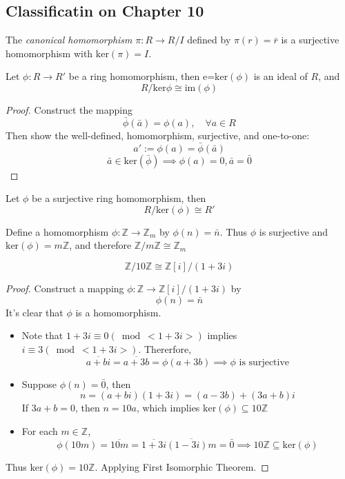 \subsection{Classificatin on Chapter 10}

\begin{proposition}
The \emph{canonical homomorphism} $\pi:R\to R/I$ defined by $\pi(r)=\bar{r}$ is a surjective homomorphism with $\mbox{ker}(\pi)=I$.
\end{proposition}
\begin{theorem}
Let $\phi:R\to R'$ be a ring homomorphism, then $\mbox{e=ker}(\phi)$ is an ideal of $R$, and
\[
R/\mbox{ker}\phi\cong\mbox{im}(\phi)
\]
\end{theorem}
\begin{proof}
Construct the mapping
\[
\bar{\phi}(\bar{a}) = \phi(a),\quad \forall a\in R
\]
Then show the well-defined, homomorphism, surjective, and one-to-one:
\[
a':=\phi(a)=\bar{\phi}(\bar a)
\]
\[
\bar{a}\in\mbox{ker}(\bar\phi)\implies\phi(a)=0,\bar a=\bar0
\]
\end{proof}
\begin{corollary}
Let $\phi$ be a surjective ring homomorphism, then 
\[
R/\mbox{ker}(\phi)\cong R'
\]
\end{corollary}
\begin{remark}
Define a homomorphism $\phi:\mathbb{Z}\to\mathbb{Z}_m$ by $\phi(n)=\bar n$. Thus $\phi$ is surjective and $\mbox{ker}(\phi)=m\mathbb{Z}$, and therefore $\mathbb{Z}/m\mathbb{Z}\cong\mathbb{Z}_m$
\end{remark}
\begin{proposition}
\[
\mathbb{Z}/10\mathbb{Z}\cong\mathbb{Z}[i]/(1+3i)
\]
\end{proposition}
\begin{proof}
Construct a mapping $\phi:\mathbb{Z}\to\mathbb{Z}[i]/(1+3i)$ by
\[
\phi(n)=\bar{n}
\]
It's clear that $\phi$ is a homomorphism.
\begin{itemize}
\item
Note that $1+3i\equiv0(\bmod <1+3i>)$ implies $i\equiv3(\bmod <1+3i>)$. Thererfore,
\[
\overline{a+bi}=\overline{a+3b}=\phi(a+3b)\implies\mbox{$\phi$ is surjective}
\]
\item
Suppose $\phi(n)=\bar0$, then
\[
n = (a+bi)(1+3i)=(a-3b)+(3a+b)i
\]
If $3a+b=0$, then $n=10a$, which implies $\mbox{ker}(\phi)\subseteq10\mathbb{Z}$
\item
For each $m\in\mathbb{Z}$,
\[
\phi(10m)=\overline{10m}=\overline{1+3i}\overline{(1-3i)m}=\bar0\implies10\mathbb{Z}\subseteq\mbox{ker}(\phi)
\]
\end{itemize}
Thus $\mbox{ker}(\phi)=10\mathbb{Z}$. Applying First Isomorphic Theorem.
\end{proof}

